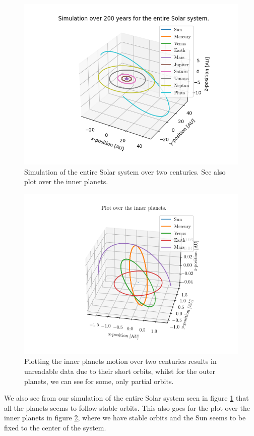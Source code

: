 \documentclass[%
reprint,
nofootinbib,
amsmath,amssymb,
aps,
]{revtex4-1}
\begin{document}
\begin{figure}[]
	\centering
	\includegraphics[width=0.9\linewidth]{../code/classes/figure/SS10.png}
	\caption{Simulation of the entire Solar system over two centuries. See also plot over the inner planets.}
	\label{fig:SS10}
\end{figure}
\begin{figure}[]
	\centering
	\includegraphics[width=0.9\linewidth]{../code/classes/figure/InnerPlanets.png}
	\caption{Plotting the inner planets motion over two centuries results in unreadable data due to their short orbits, whilst for the outer planets, we can see for some, only partial orbits.}
	\label{fig:IP}
\end{figure}
We also see from our simulation of the entire Solar system seen in figure \ref{fig:SS10} that all the planets seems to follow stable orbits. This also goes for the plot over the inner planets in figure \ref{fig:IP}, where we have stable orbits and the Sun seems to be fixed to the center of the system. 
\end{document}
